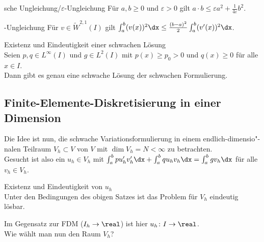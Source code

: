\linie

\begin{Lemma}{sche Ungleichung/$\varepsilon$-Ungleichung}
    Für $a, b \ge 0$ und $\varepsilon > 0$ gilt
    $a \cdot b \le \varepsilon a^2 + \frac{1}{4\varepsilon} b^2$.
\end{Lemma}

\begin{Lemma}{-Ungleichung}
    Für $v \in \widetilde{W}^{2,1}(I)$ gilt
    $\int_a^b (v(x))^2 \dx \le \frac{(b - a)^2}{2} \int_a^b (v'(x))^2 \dx$.
\end{Lemma}

\begin{Satz}{Existenz und Eindeutigkeit einer schwachen Lösung}\\
    Seien $p, q \in L^\infty(I)$ und $g \in L^2(I)$ mit
    $p(x) \ge p_0 > 0$ und $q(x) \ge 0$ für alle $x \in I$.\\
    Dann gibt es genau eine schwache Lösung der schwachen Formulierung.
\end{Satz}

\subsection{%
    Finite-Elemente-Diskretisierung in einer Dimension%
}

\begin{Bem}
    Die Idee ist nun, die schwache Variationsformulierung in einem
    endlich-dimensio"-nalen Teilraum $V_h \subset V$ von $V$ mit
    $\dim V_h = N < \infty$ zu betrachten.\\
    Gesucht ist also ein $u_h \in V_h$ mit
    $\int_a^b pu_h'v_h'\dx + \int_a^b qu_hv_h\dx = \int_a^b gv_h\dx$
    für alle $v_h \in V_h$.
\end{Bem}

\begin{Satz}{Existenz und Eindeutigkeit von $u_h$}\\
    Unter den Bedingungen des obigen Satzes ist das Problem für $V_h$
    eindeutig lösbar.
\end{Satz}

\begin{Bem}
    Im Gegensatz zur FDM ($I_h \rightarrow \real$) ist hier
    $u_h\colon I \rightarrow \real$.\\
    Wie wählt man nun den Raum $V_h$?
\end{Bem}

\linie

